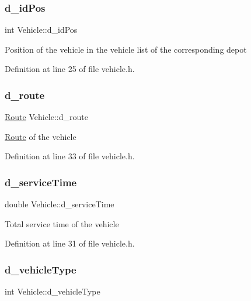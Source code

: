 \subsubsection{\texorpdfstring{d\+\_\+id\+Pos}{d\_idPos}}
{\footnotesize\ttfamily int Vehicle\+::d\+\_\+id\+Pos\hspace{0.3cm}{\ttfamily [private]}}

Position of the vehicle in the vehicle list of the corresponding depot 

Definition at line 25 of file vehicle.\+h.

\mbox{\label{class_vehicle_a423d1aa2a6ba43debf87f85d5b30bf29}} 
\subsubsection{\texorpdfstring{d\+\_\+route}{d\_route}}
{\footnotesize\ttfamily \hyperlink{class_route}{Route} Vehicle\+::d\+\_\+route\hspace{0.3cm}{\ttfamily [private]}}

\hyperlink{class_route}{Route} of the vehicle 

Definition at line 33 of file vehicle.\+h.

\mbox{\label{class_vehicle_a0e6c7fd93b28501975e8c8144b6da1d7}} 
\subsubsection{\texorpdfstring{d\+\_\+service\+Time}{d\_serviceTime}}
{\footnotesize\ttfamily double Vehicle\+::d\+\_\+service\+Time\hspace{0.3cm}{\ttfamily [private]}}

Total service time of the vehicle 

Definition at line 31 of file vehicle.\+h.

\mbox{\label{class_vehicle_af140a0f32589d5582cce381c1d2e1d73}} 
\subsubsection{\texorpdfstring{d\+\_\+vehicle\+Type}{d\_vehicleType}}
{\footnotesize\ttfamily int Vehicle\+::d\+\_\+vehicle\+Type\hspace{0.3cm}{\ttfamily [private]}}


